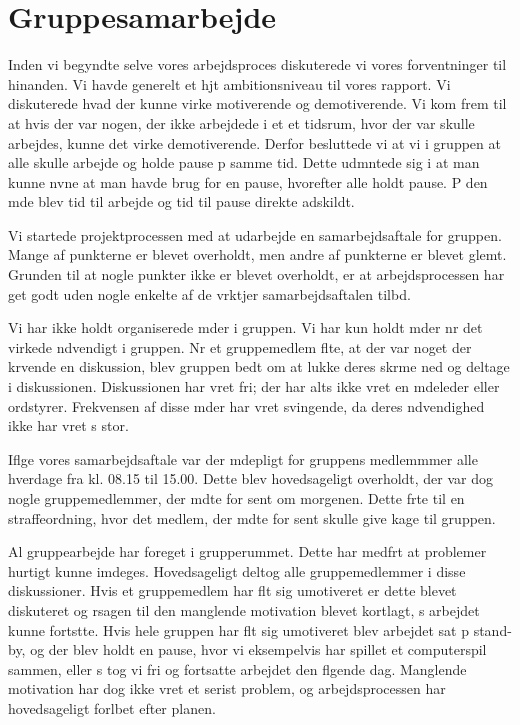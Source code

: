 \section{Gruppesamarbejde}
Inden vi begyndte selve vores arbejdsproces diskuterede vi vores forventninger til hinanden. Vi havde generelt et hjt ambitionsniveau til vores rapport. 
Vi diskuterede hvad der kunne virke motiverende og demotiverende. Vi kom frem til at hvis der var nogen, der ikke arbejdede i et et tidsrum, hvor der var skulle arbejdes, kunne det virke demotiverende.
Derfor besluttede vi at vi i gruppen at alle skulle arbejde og holde pause p samme tid. Dette udmntede sig i at man kunne nvne at man havde brug for en pause, hvorefter alle holdt pause. 
P den mde blev tid til arbejde og tid til pause direkte adskildt.


Vi startede projektprocessen med at udarbejde en samarbejdsaftale for gruppen. Mange af punkterne er blevet overholdt, men andre af punkterne er blevet glemt. 
Grunden til at nogle punkter ikke er blevet overholdt, er at arbejdsprocessen har get godt uden nogle enkelte af de vrktjer samarbejdsaftalen tilbd.


Vi har ikke holdt organiserede mder i gruppen. Vi har kun holdt mder nr det virkede ndvendigt i gruppen. 
Nr et gruppemedlem flte, at der var noget der krvende en diskussion, blev gruppen bedt om at lukke deres skrme ned og deltage i diskussionen. 
Diskussionen har vret fri; der har alts ikke vret en mdeleder eller ordstyrer.
Frekvensen af disse mder har vret svingende, da deres ndvendighed ikke har vret s stor.


Iflge vores samarbejdsaftale var der mdepligt for gruppens medlemmmer alle hverdage fra kl. 08.15 til 15.00. 
Dette blev hovedsageligt overholdt, der var dog nogle gruppemedlemmer, der mdte for sent om morgenen. 
Dette frte til en straffeordning, hvor det medlem, der mdte for sent skulle give kage til gruppen. 


Al gruppearbejde har foreget i grupperummet. Dette har medfrt at problemer hurtigt kunne imdeges. 
Hovedsageligt deltog alle gruppemedlemmer i disse diskussioner.
Hvis et gruppemedlem har flt sig umotiveret er dette blevet diskuteret og rsagen til den manglende motivation blevet kortlagt, s arbejdet kunne fortstte.
Hvis hele gruppen har flt sig umotiveret blev arbejdet sat p stand-by, og der blev holdt en pause, hvor vi eksempelvis har spillet et computerspil sammen, eller s tog vi fri og fortsatte arbejdet den flgende dag.
Manglende motivation har dog ikke vret et serist problem, og arbejdsprocessen har hovedsageligt forlbet efter planen.


